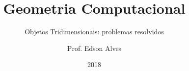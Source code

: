 \title{Geometria Computacional}
\subtitle{Objetos Tridimensionais: problemas resolvidos}
\date{2018}
\author{Prof. Edson Alves}
